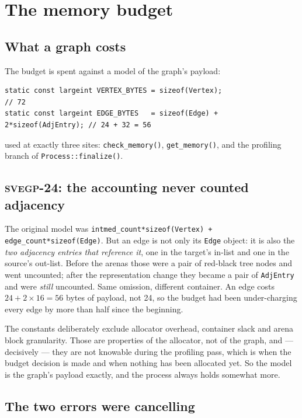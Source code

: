 \documentclass[11pt,a4paper]{report}
\newcommand{\svegp}[1]{\textsc{svegp-#1}}
\newcommand{\code}[1]{\texttt{#1}}
\begin{document}
\chapter{The memory budget}
\label{ch:mem}

\section{What a graph costs}

The budget is spent against a model of the graph's payload:

\begin{lstlisting}
static const largeint VERTEX_BYTES = sizeof(Vertex);                    // 72
static const largeint EDGE_BYTES   = sizeof(Edge) + 2*sizeof(AdjEntry); // 24 + 32 = 56
\end{lstlisting}

used at exactly three sites: \code{check\_memory()}, \code{get\_memory()}, and
the profiling branch of \code{Process::finalize()}.

\section{\svegp{24}: the accounting never counted adjacency}

The original model was \code{intmed\_count*sizeof(Vertex) + edge\_count*sizeof(Edge)}.
But an edge is not only its \code{Edge} object: it is also the \emph{two
adjacency entries that reference it}, one in the target's in-list and one in the
source's out-list. Before the arenas those were a pair of red-black tree nodes
and went uncounted; after the representation change they became a pair of
\code{AdjEntry} and were \emph{still} uncounted. Same omission, different
container. An edge costs $24+2\times16=56$ bytes of payload, not 24, so the
budget had been under-charging every edge by more than half since the beginning.

The constants deliberately exclude allocator overhead, container slack and arena
block granularity. Those are properties of the allocator, not of the graph, and
--- decisively --- they are not knowable during the profiling pass, which is
when the budget decision is made and when nothing has been allocated yet. So the
model is the graph's payload exactly, and the process always holds somewhat
more.

\section{The two errors were cancelling}
\end{document}
